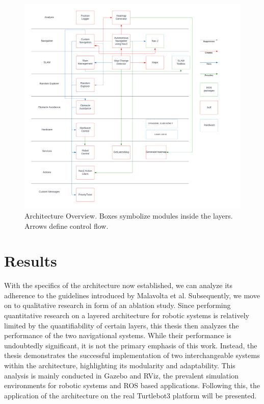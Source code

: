 \documentclass[%
paper=A4,               %
twoside=true,           %
openright,              %
11pt,                   %
bibliography=totoc,     %
titlepage=on,           %
DIV=12,                 %
BCOR=1.5cm,             %
parskip=half,            %
final
]{scrreprt}
\begin{document}
			
	\begin{figure}[H]
		\begin{flushleft}
		\includegraphics[width=1.3\textwidth]{Graphics/ArchitectureOverview}
		\caption{Architecture Overview. Boxes symbolize modules inside the layers. Arrows define control flow.}
		\label{fig: fig8}
		\end{flushleft}
	\end{figure}
	
	

	\chapter{Results}
	With the specifics of the architecture now established, we can analyze its adherence to the guidelines introduced by Malavolta et al. Subsequently, we move on to qualitative research in form of an ablation study.
	Since performing quantitative research on a layered architecture for robotic systems is relatively limited by the quantifiability of certain layers, this thesis then analyzes the performance of the two navigational systems. While their performance is undoubtedly significant, it is not the primary emphasis of this work. Instead, the thesis demonstrates the successful implementation of two interchangeable systems within the architecture, highlighting its modularity and adaptability. \newline
	 This analysis is mainly conducted in Gazebo and RViz, the prevalent simulation environments for robotic systems and ROS based applications. Following this, the application of the architecture on the real Turtlebot3 platform will be presented.
\end{document}
